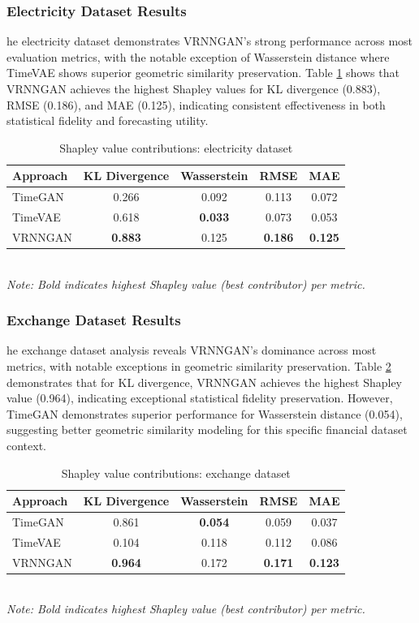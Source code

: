 \documentclass{article}
\begin{document}
\subsubsection{Electricity Dataset Results}

he electricity dataset demonstrates VRNNGAN's strong performance across most evaluation metrics, with the notable exception of Wasserstein distance where TimeVAE shows superior geometric similarity preservation. Table \ref{tab:shapley_electricity} shows that VRNNGAN achieves the highest Shapley values for KL divergence (0.883), RMSE (0.186), and MAE (0.125), indicating consistent effectiveness in both statistical fidelity and forecasting utility.
\begin{table}[H]
\centering
\caption{Shapley value contributions: electricity dataset}
\label{tab:shapley_electricity}
\begin{tabular}{lcccc}
\toprule
\textbf{Approach} & \textbf{KL Divergence} & \textbf{Wasserstein} & \textbf{RMSE} & \textbf{MAE} \\
\midrule
TimeGAN & 0.266 & 0.092 & 0.113 & 0.072 \\
TimeVAE & 0.618 & \textbf{0.033} & 0.073 & 0.053 \\
VRNNGAN & \textbf{0.883} & 0.125 & \textbf{0.186} & \textbf{0.125} \\
\bottomrule
\end{tabular}
\\[0.5em]
\footnotesize
\textit{Note: Bold indicates highest Shapley value (best contributor) per metric.}
\end{table}

\subsubsection{Exchange Dataset Results}
he exchange dataset analysis reveals VRNNGAN's dominance across most metrics, with notable exceptions in geometric similarity preservation. Table \ref{tab:shapley_exchange} demonstrates that for KL divergence, VRNNGAN achieves the highest Shapley value (0.964), indicating exceptional statistical fidelity preservation. However, TimeGAN demonstrates superior performance for Wasserstein distance (0.054), suggesting better geometric similarity modeling for this specific financial dataset context.

\begin{table}[H]
\centering
\caption{Shapley value contributions: exchange dataset}
\label{tab:shapley_exchange}
\begin{tabular}{lcccc}
\toprule
\textbf{Approach} & \textbf{KL Divergence} & \textbf{Wasserstein} & \textbf{RMSE} & \textbf{MAE} \\
\midrule
TimeGAN & 0.861 & \textbf{0.054} & 0.059 & 0.037 \\
TimeVAE & 0.104 & 0.118 & 0.112 & 0.086 \\
VRNNGAN & \textbf{0.964} & 0.172 & \textbf{0.171} & \textbf{0.123} \\
\bottomrule
\end{tabular}
\\[0.5em]
\footnotesize
\textit{Note: Bold indicates highest Shapley value (best contributor) per metric.}
\end{table}
\end{document}
